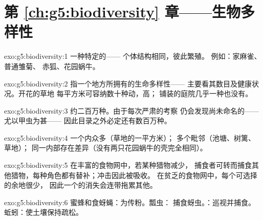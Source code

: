 \section*{第 \ref{ch:g5:biodiversity} 章——生物多样性}

\begin{solution}{exo:g5:biodiversity:1}
一种特定的——
个体结构相同，彼此繁殖。
例如：家麻雀、普通雏菊、
赤狐、花园蜗牛。
\end{solution}

\begin{solution}{exo:g5:biodiversity:2}
指一个地方所拥有的生命多样性——
主要看其数目及健康状况。开花的草地
每平方米可容纳数十种动，高；
铺装的庭院几乎一种也没有。
\end{solution}

\begin{solution}{exo:g5:biodiversity:3}
约二百万种。由于每次严肃的考察
仍会发现尚未命名的——尤以甲虫为甚——
因此目录之外必定还有数百万种。
\end{solution}

\begin{solution}{exo:g5:biodiversity:4}
一个内众多（草地的一平方米）；
多个毗邻（池塘、树篱、草地）；
同一内部存在差异（没有两只花园蜗牛的壳完全相同）。
\end{solution}

\begin{solution}{exo:g5:biodiversity:5}
在丰富的食物网中，若某种猎物减少，
捕食者可转而捕食其他猎物，每种角色都有替补；冲击因此被吸收。
在贫乏的食物网中，每个可选择的余地很少，
因此一个的消失会连带拖累其他。
\end{solution}

\begin{solution}{exo:g5:biodiversity:6}
蜜蜂和食蚜蝇：为传粉。瓢虫：
捕食蚜虫。：巡视并捕食。
蚯蚓：使土壤保持疏松。
\end{solution}

